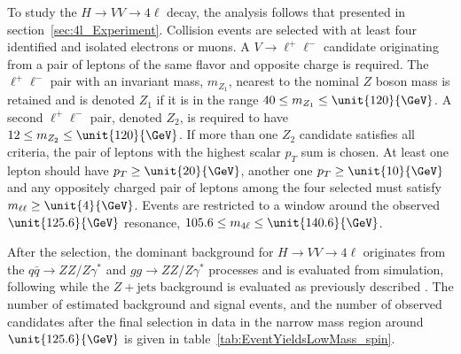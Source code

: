 To study the $H \to VV \to 4\ell$ decay, the analysis follows that presented in section~\ref{sec:4l_Experiment}. Collision events are selected with at least four identified and isolated electrons or muons. A $V \to \ell^+\ell^-$ candidate originating from a pair of leptons of the same flavor and opposite charge is required. The $\ell^+\ell^-$ pair with an invariant mass, $m_{Z_1}$, nearest to the nominal $Z$ boson mass is retained
and is denoted $Z_{1}$ if it is in the range $40 \le m_{Z_1} \le \unit{120}{\GeV}$.
A second $\ell^{+}\ell^{-}$ pair, denoted $Z_{2}$, is required to have $12 \le m_{Z_2} \le \unit{120}{\GeV}$.
If more than one $Z_{2}$ candidate satisfies all criteria, the pair of
leptons with the highest scalar $p_{T}$ sum is chosen.
At least one lepton should have $p_{T} \ge \unit{20}{\GeV}$, another one
$p_{T} \ge \unit{10}{\GeV}$ and any oppositely charged pair of leptons among the four selected must satisfy
$m_{\ell\ell} \ge \unit{4}{\GeV}$. Events are restricted to a window around the observed
$\unit{125.6}{\GeV}$ resonance, $105.6 \le m_{4\ell} \le \unit{140.6}{\GeV}$.

After the selection, the dominant background for $H \to VV \to 4\ell$ originates from the
$q\bar{q} \to ZZ/Z\gamma^*$ and $gg \to ZZ/Z\gamma^*$ processes
and is evaluated from simulation, following \cite{Chatrchyan:2013mxa}
while the $Z + \text{jets}$ background is evaluated as previously described \cite{Chatrchyan:2013mxa}. The number of estimated background and signal events, and the number of
observed candidates after the final selection in data in the
narrow mass region around $\unit{125.6}{\GeV}$  is given in table~\ref{tab:EventYieldsLowMass_spin}.

